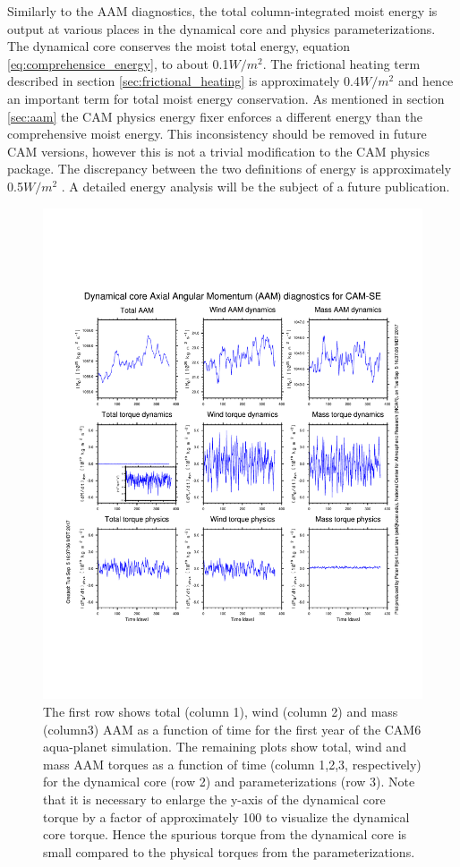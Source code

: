 \documentclass{agujournal}
\begin{document}
{Similarly to the AAM diagnostics, the total column-integrated moist energy is output at various places in the dynamical core and physics parameterizations. The dynamical core conserves the moist total energy, equation \eqref{eq:comprehensice_energy}, to about 0.1$W/m^2$. The frictional heating term described in section \ref{sec:frictional_heating} is approximately 0.4$W/m^2$ and hence an important term for total moist energy conservation. As mentioned in section \ref{sec:aam} the CAM physics energy fixer enforces a different energy than the comprehensive moist energy. This inconsistency should be removed in future CAM versions, however this is not a trivial modification to the CAM physics package. The discrepancy between the two definitions of energy is approximately 0.5$W/m^2$ \citep[similar to what ][ found when just including the correct heat capacity for water vapor in the total energy equation]{T2011LNCSEb}. A detailed energy analysis will be the subject of a future publication.
%
\begin{figure}[h]
\centering
\includegraphics[width=30pc]{figs/aam.pdf}
\caption{The first row shows total (column 1), wind (column 2) and mass (column3) AAM as a function of time for the first year of the CAM6 aqua-planet simulation. The remaining plots show total, wind and mass AAM torques as a function of time (column 1,2,3, respectively) for the dynamical core (row 2) and parameterizations (row 3). Note that it is necessary to enlarge the y-axis of the dynamical core torque by a factor of approximately 100 to visualize the dynamical core torque. Hence the spurious torque from the dynamical core is small compared to the physical torques from the parameterizations.}
\label{fig:aam}
\end{figure}
}
\end{document}
